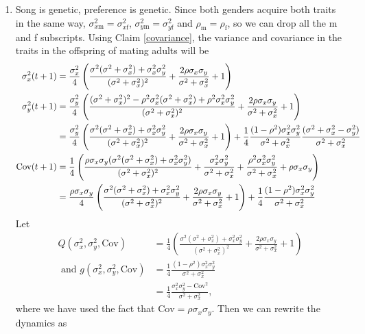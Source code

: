 \documentclass{article}
\newcommand{\x}[1]{\text{#1}}
\newcommand{\Cov}{\text{Cov}}
\begin{document}
\begin{enumerate}
\item Song is genetic, preference is genetic. Since both genders acquire both traits in the same way, $\sigma_{x\x{m}}^2=\sigma_{x\x{f}}^2$,  $\sigma_{y\x{m}}^2=\sigma_{y\x{f}}^2$ and $\rho_\x{m}=\rho_\x{f}$, so we can drop all the m and f subscripts. Using Claim \ref{covariance}, the variance and covariance in the traits in the offspring of mating adults will be 
\begin{align*}
\sigma_x^2(t+1)&=\frac{\sigma_x^2}{4}\left(\frac{\sigma^2(\sigma^2+\sigma_x^2)+\sigma_x^2\sigma_y^2}{(\sigma^2+\sigma_x^2)^2}+\frac{2\rho\sigma_x\sigma_y}{\sigma^2+\sigma_x^2}+1\right) 
\\\sigma_y^2(t+1)&=\frac{\sigma_y^2}{4}\left(\frac{(\sigma^2+\sigma_x^2)^2-\rho^2\sigma_x^2(\sigma^2+\sigma_x^2)+\rho^2\sigma_x^2\sigma_y^2}{(\sigma^2+\sigma_x^2)^2}+\frac{2\rho\sigma_x\sigma_y}{\sigma^2+\sigma_x^2}+1\right) 
\notag
\\&=\frac{\sigma_y^2}{4}\left(\frac{\sigma^2(\sigma^2+\sigma_x^2)+\sigma_x^2\sigma_y^2}{(\sigma^2+\sigma_x^2)^2}+\frac{2\rho\sigma_x\sigma_y}{\sigma^2+\sigma_x^2}+1\right) +\frac{1}{4}\frac{(1-\rho^2)\sigma_x^2\sigma_y^2}{\sigma^2+\sigma_x^2}\frac{(\sigma^2+\sigma_x^2-\sigma_y^2)}{\sigma^2+\sigma_x^2}
\\\Cov(t+1)&=\frac{1}{4}\left(\frac{\rho\sigma_x\sigma_y(\sigma^2(\sigma^2+\sigma_x^2)+\sigma_x^2\sigma_y^2)}{(\sigma^2+\sigma_x^2)^2}+\frac{\sigma_x^2\sigma_y^2}{\sigma^2+\sigma_x^2}+\frac{\rho^2\sigma_x^2\sigma_y^2}{\sigma^2+\sigma_x^2}+\rho\sigma_x\sigma_y\right)  \notag
\\&=\frac{\rho\sigma_x\sigma_y}{4}\left(\frac{\sigma^2(\sigma^2+\sigma_x^2)+\sigma_x^2\sigma_y^2}{(\sigma^2+\sigma_x^2)^2}+\frac{2\rho\sigma_x\sigma_y}{\sigma^2+\sigma_x^2}+1\right) +\frac{1}{4}\frac{(1-\rho^2)\sigma_x^2\sigma_y^2}{\sigma^2+\sigma_x^2}
\end{align*}
Let 
\begin{align*}Q(\sigma_x^2,\sigma_y^2,\Cov)&=\frac{1}{4}\left(\frac{\sigma^2(\sigma^2+\sigma_x^2)+\sigma_x^2\sigma_y^2}{(\sigma^2+\sigma_x^2)^2}+\frac{2\rho\sigma_x\sigma_y}{\sigma^2+\sigma_x^2}+1\right)
\\\text{ and } g(\sigma_x^2,\sigma_y^2,\Cov)&=\frac{1}{4}\frac{(1-\rho^2)\sigma_x^2\sigma_y^2}{\sigma^2+\sigma_x^2}
\\&=\frac{1}{4}\frac{\sigma_x^2\sigma_y^2-\Cov^2}{\sigma^2+\sigma_x^2},
\end{align*}
where we have used the fact that $\Cov=\rho\sigma_x\sigma_y$. 
Then we can rewrite the dynamics as 
\begin{align}

\end{align}
\end{enumerate}
\end{document}
